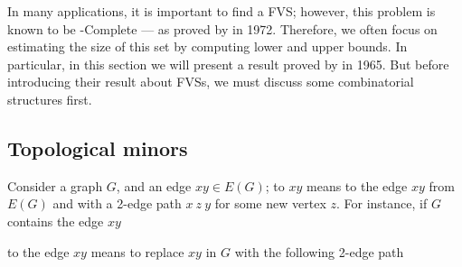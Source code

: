 \documentclass[a4paper, 12pt]{report}
\begin{document}
    In many applications, it is important to find a  FVS; however, this problem is known to be \NPclass-Complete --- as proved by \textcite{karp} in 1972. Therefore, we often focus on estimating the size of this set by computing lower and upper bounds. In particular, in this section we will present a result proved by \textcite{erdos} in 1965. But before introducing their result about FVSs, we must discuss some combinatorial structures first.

    \subsection{Topological minors}

    Consider a graph $G$, and an edge $xy \in E(G)$; to  $xy$ means to  the edge $xy$ from $E(G)$ and  with a 2-edge path $x \ z \ y$ for some new vertex $z$. For instance, if $G$ contains the edge $xy$

    \begin{figure}[H]
        \centering
    \end{figure}

    to  the edge $xy$ means to replace $xy$ in $G$ with the following 2-edge path

    \begin{figure}[H]
        \centering
    \end{figure}
\end{document}
